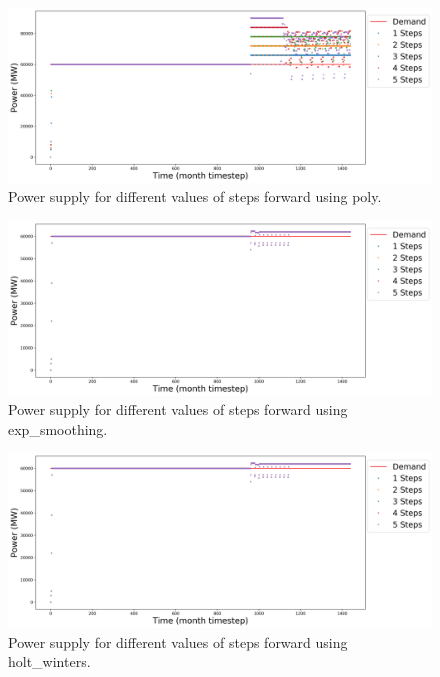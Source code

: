 \documentclass[11pt]{article}
\begin{document}
\begin{figure}[H]
	\centering
	\includegraphics[width=\textwidth]{23-figures/23-power-buffer0-poly-steps.png} 
	\hfill
	\caption{Power supply for different values of steps forward using poly.}
	\label{fig:23-ste-poly}
\end{figure}

\begin{figure}[H]
	\centering
	\includegraphics[width=\textwidth]{23-figures/23-power-buffer0-exp_smoothing-steps.png} 
	\hfill
	\caption{Power supply for different values of steps forward using exp\_smoothing.}
	\label{fig:23-ste-exp_smoothing}
\end{figure}

\begin{figure}[H]
	\centering
	\includegraphics[width=\textwidth]{23-figures/23-power-buffer0-holt_winters-steps.png} 
	\hfill
	\caption{Power supply for different values of steps forward using holt\_winters.}
	\label{fig:23-ste-hots_winters}
\end{figure}
\end{document}
